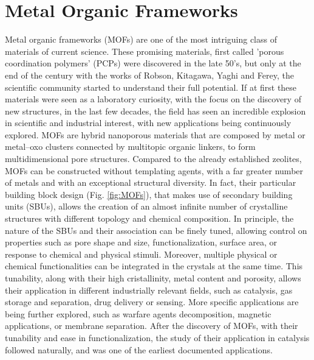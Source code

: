\section{Metal Organic Frameworks}
Metal organic frameworks (MOFs) are one of the most intriguing class of materials of current science. These promising materials, first called 'porous coordination polymers' (PCPs) were discovered in the late 50's, but only at the end of the century with the works of Robson\cite{batten1995two,hoskins1990design}, Kitagawa\cite{kitagawa1991synthesis, kitagawa1993synthesis}, Yaghi\cite{yaghi1995hydrothermal} and Ferey\cite{riou1998hybrid}, the scientific community started to understand their full potential. If at first these materials were seen as a laboratory curiosity, with the focus on the discovery of new structures, in the last few decades, the field has seen an incredible explosion in scientific and industrial interest, with new applications being continuously explored\cite{furukawa2013chemistry}. MOFs are hybrid nanoporous materials that are composed by metal or metal--oxo clusters connected by multitopic organic linkers, to form multidimensional pore structures. Compared to the already established zeolites, MOFs can be constructed without templating agents, with a far greater number of metals and with an exceptional structural diversity. In fact, their particular building block design (Fig. \ref{fig:MOFs}), that makes use of secondary building units (SBUs), allows the creation of an almost infinite number of crystalline structures with different topology and chemical composition. In principle, the nature of the SBUs and their association can be finely tuned\cite{stock2011synthesis}, allowing control on properties such as pore shape and size, functionalization, surface area, or response to chemical and physical stimuli\cite{zhou2014metal,zhou2012introduction}. Moreover, multiple physical or chemical functionalities can be integrated in the crystals at the same time\cite{li2016applications}. 
This tunability, along with their high cristallinity, metal content and porosity, allows their application in different industrially relevant fields, such as catalysis, gas storage and separation, drug delivery or sensing. More specific applications are being further explored, such as warfare agents decomposition, magnetic applications, or membrane separation. 
After the discovery of MOFs, with their tunability and ease in functionalization, the study of their application in catalysis followed naturally, and was one of the earliest documented applications\cite{Fujita1994}. 
